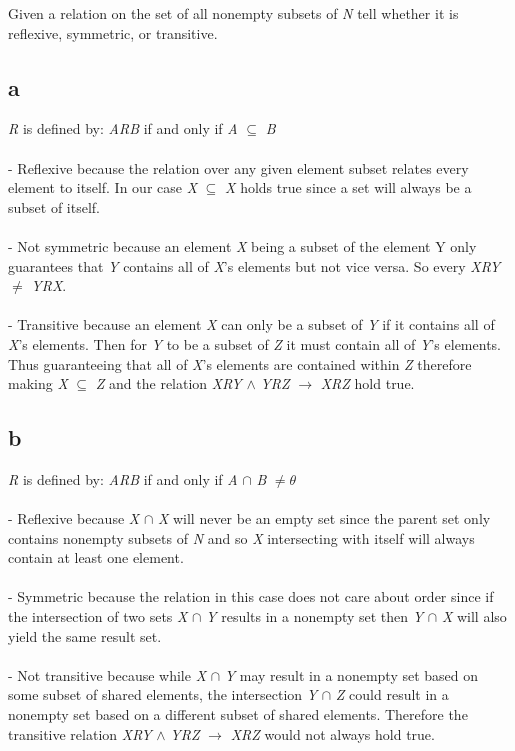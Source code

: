 \documentclass{article}
\begin{document}
Given a relation on the set of all nonempty subsets of \textit{N} tell whether it is reflexive, symmetric, or transitive.

\subsection*{a} 
\textit{R} is defined by: \textit{ARB} if and only if \textit{A} $\subseteq$ \textit{B} 
\\\\  - Reflexive because the relation over any given element subset relates every element to itself. In our case \textit{X} $\subseteq$ \textit{X} holds true since a set will always be a subset of itself.
\\\\  - Not symmetric because an element \textit{X} being a subset of the element Y only guarantees that \textit{Y} contains all of \textit{X}'s elements but not vice versa. So every \textit{XRY} $\neq$ \textit{YRX}. 
\\\\  - Transitive because an element \textit{X} can only be a subset of \textit{Y} if it contains all of \textit{X}'s elements. Then for \textit{Y} to be a subset of \textit{Z} it must contain all of \textit{Y}'s elements. Thus guaranteeing that all of \textit{X}'s elements are contained within \textit{Z} therefore making \textit{X} $\subseteq$ \textit{Z} and the relation \textit{XRY} $\land$ \textit{YRZ} $\rightarrow$ \textit{XRZ} hold true.  
    
\subsection*{b}
\textit{R} is defined by: \textit{ARB} if and only if \textit{A} $\cap$ \textit{B} $\neq \theta$  
\\\\  - Reflexive because \textit{X} $\cap$ \textit{X} will never be an empty set since the parent set only contains nonempty subsets of \textit{N} and so \textit{X} intersecting with itself will always contain at least one element.
\\\\  - Symmetric because the relation in this case does not care about order since if the intersection of two sets \textit{X} $\cap$ \textit{Y} results in a nonempty set then \textit{Y} $\cap$ \textit{X} will also yield the same result set.
\\\\  - Not transitive because while \textit{X} $\cap$ \textit{Y} may result in a nonempty set based on some subset of shared elements, the intersection \textit{Y} $\cap$ \textit{Z} could result in a nonempty set based on a different subset of shared elements. Therefore the transitive relation \textit{XRY} $\land$ \textit{YRZ} $\rightarrow$ \textit{XRZ} would not always hold true.
    
\end{document}
